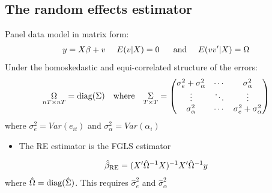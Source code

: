 \documentclass[a4paper,twoside,11pt]{article}
\begin{document}
\subsection{The random effects estimator}
Panel data model in matrix form:
\begin{equation*}
\begin{aligned}
y = X \beta + v \ \ \ \ E(v|X)=0 \ \ \ \ \ \textmd{and} \ \ \ \ E(vv'|X)=\Omega
\end{aligned} 
\end{equation*}
Under the homoskedastic and equi-correlated structure of the errors:
\begin{equation*}
\begin{aligned}
\underset{nT \times nT}{\Omega} = \textmd{diag}(\Sigma) \ \ \ \textmd{where} \ \ \ \underset{T \times T}{\Sigma} = \begin{pmatrix}
\sigma_e^2 + \sigma_\alpha^2 & \cdots & \sigma_\alpha^2 \\
\vdots & \ddots & \vdots \\
\sigma_\alpha^2 & \cdots & \sigma_e^2 + \sigma_\alpha^2
\end{pmatrix}
\end{aligned} 
\end{equation*}
where $\sigma_e^2 = Var(e_{it})$ and $\sigma_\alpha^2 = Var(\alpha_i)$
\begin{itemize}
    \item The RE estimator is the FGLS estimator
\end{itemize}
\begin{equation*}
\begin{aligned}
\hat{\beta}_{\textmd{RE}} = (X' \hat{\Omega}^{-1} X)^{-1} X' \hat{\Omega}^{-1} y
\end{aligned} 
\end{equation*}
where $\hat{\Omega} = \textmd{diag}(\hat{\Sigma})$. This requires $\hat{\sigma}_e^2$ and $\hat{\sigma}_\alpha^2$
\end{document}

